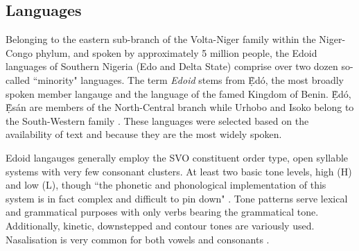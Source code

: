 \documentclass{article} %
\begin{document}


\subsection{Languages}


Belonging to the eastern sub-branch of the Volta-Niger family within the Niger-Congo phylum, and spoken by approximately 5 million people, the Edoid languages of Southern Nigeria (Edo and Delta State) comprise over two dozen so-called ``minority" languages. The term \emph{Edoid} stems from \d{\`E}d{\'o}, the most broadly spoken member langauge and the language of the famed Kingdom of Benin. \d{\`E}d{\'o}, \d{\`E}s{\'a}n are members of the North-Central branch while Urhobo and Isoko belong to the South-Western family \citep{wiki_Edoid}. These languages were selected based on the availability of text and because they are the most widely spoken.

Edoid langauges generally employ the SVO constituent order type, open syllable systems with very few consonant clusters. At least two basic tone levels, high (H) and low (L), though ``the phonetic and phonological implementation of this system is in fact complex and difficult to pin down" \citep{rolle2013phonetics, ogie2009multi, adeniyi2010tone, ilolo2013vowel}. Tone patterns serve lexical and grammatical purposes with only verbs bearing the grammatical tone. Additionally, kinetic, downstepped and contour tones are variously used. Nasalisation is very common for both vowels and consonants \citep{Elugbe_1989, isoko_phonetics, ikoyo2018phonetic}. 

\end{document}
